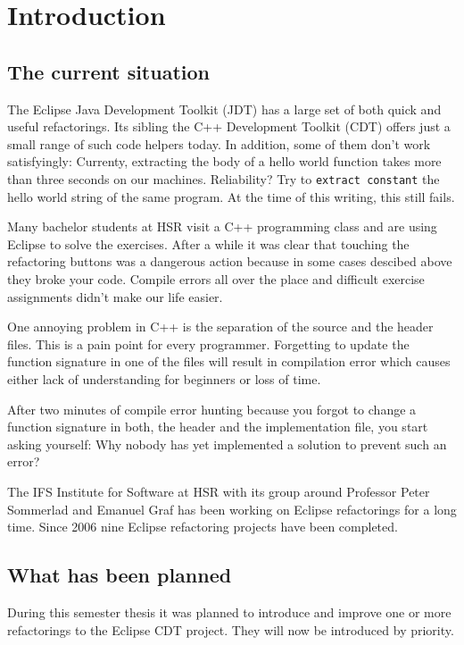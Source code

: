 \chapter{Introduction}
\thispagestyle{fancy}

\section{The current situation}

The Eclipse Java Development Toolkit (JDT) has a large set of both quick and
useful refactorings. Its sibling the C++ Development Toolkit (CDT) offers just a
small range of such code helpers today. In addition, some of them don't work
satisfyingly: Currenty, extracting the body of a hello world function takes more
than three seconds on our machines. Reliability? Try to \texttt{extract
constant} the hello world string of the same program. At the time of this 
writing, this still fails.

Many bachelor students at HSR visit a C++ programming class and are using 
Eclipse to solve the exercises. After a while it was clear that
touching the refactoring buttons was a dangerous action because in some cases
descibed above they broke your code. Compile errors all over the place and
difficult exercise assignments didn't make our life easier.

One annoying problem in C++ is the separation of the source and the header
files. This is a pain point for every programmer. Forgetting to update the
function signature in one of the files will result in compilation error which
causes either lack of understanding for beginners or loss of time.

After two minutes of compile error hunting because you forgot to change a
function signature in both, the header and the implementation file, you start
asking yourself: Why nobody has yet implemented a solution to prevent such an
error?

The IFS Institute for Software at HSR with its group around Professor Peter
Sommerlad and
Emanuel Graf has been working on Eclipse refactorings for a long time. Since
2006 nine Eclipse refactoring projects have been completed.

\section{What has been planned}

During this semester thesis it was planned to introduce and improve one or more
refactorings to the Eclipse CDT project. They will now be introduced by 
priority.

